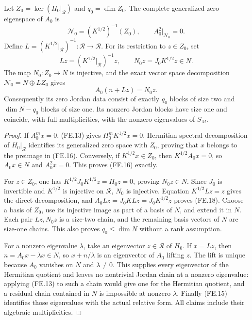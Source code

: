 \begin{theorem}
Let \(Z_0=\ker(H_0|_{\mathcal R})\) and \(q_0=\dim Z_0\).
The complete generalized zero eigenspace of \(A_0\) is
\[
 \mathcal N_0=(K^{1/2})^{-1}(Z_0),\qquad A_0^2|_{\mathcal N_0}=0.
 \tag{FE.16}
\]
Define \(L=(K^{1/2}|_{\mathcal R})^{-1}:\mathcal R\to\mathcal R\).
For its restriction to \(z\in Z_0\), set
\[
 Lz=(K^{1/2}|_{\mathcal R})^{-1}z,\qquad
 N_0z=J_0K^{1/2}z\in N.
 \tag{FE.17}
\]
The map \(N_0:Z_0\to N\) is injective, and the exact vector
space decomposition \(\mathcal N_0=N\oplus LZ_0\) gives
\[
 A_0(n+Lz)=N_0z.
 \tag{FE.18}
\]
Consequently its zero Jordan data consist of exactly \(q_0\)
blocks of size two and \(\dim N-q_0\) blocks of size one.
Its nonzero Jordan blocks have size one and coincide, with full
multiplicities, with the nonzero eigenvalues of \(S_M\).
\end{theorem}
\begin{proof}
If \(A_0^m x=0\), (FE.13) gives
\(H_0^mK^{1/2}x=0\).  Hermitian spectral decomposition of
\(H_0|_{\mathcal R}\) identifies its generalized zero
space with \(Z_0\), proving that \(x\) belongs to the
preimage in (FE.16).  Conversely, if \(K^{1/2}x\in Z_0\),
then \(K^{1/2}A_0x=0\), so \(A_0x\in N\) and
\(A_0^2x=0\).  This proves (FE.16) exactly.

For \(z\in Z_0\), one has
\(K^{1/2}J_0K^{1/2}z=H_0z=0\), proving \(N_0z\in N\).
Since \(J_0\) is invertible and \(K^{1/2}\) is injective
on \(\mathcal R\), \(N_0\) is injective.  Equation
\(K^{1/2}Lz=z\) gives the direct decomposition, and
\(A_0Lz=J_0K Lz=J_0K^{1/2}z\) proves (FE.18).
Choose a basis of \(Z_0\), use its injective image as part of
a basis of \(N\), and extend it in \(N\).  Each pair
\(Lz,N_0z\) is a size-two chain, and the remaining basis
vectors of \(N\) are size-one chains.  This also proves
\(q_0\le\dim N\) without a rank assumption.

For a nonzero eigenvalue \(\lambda\), take an eigenvector
\(z\in\mathcal R\) of \(H_0\).  If \(x=Lz\), then
\(n=A_0x-\lambda x\in N\), so
\(x+n/\lambda\) is an eigenvector of \(A_0\) lifting
\(z\).  The lift is unique because \(A_0\) vanishes on
\(N\) and \(\lambda\ne0\).  This supplies every
eigenvector of the Hermitian quotient and leaves no nontrivial
Jordan chain at a nonzero eigenvalue: applying (FE.13) to such
a chain would give one for the Hermitian quotient, and a residual
chain contained in \(N\) is impossible at nonzero \(\lambda\).
Finally (FE.15) identifies those eigenvalues with the actual
relative form.  All claims include their algebraic multiplicities.
\end{proof}

